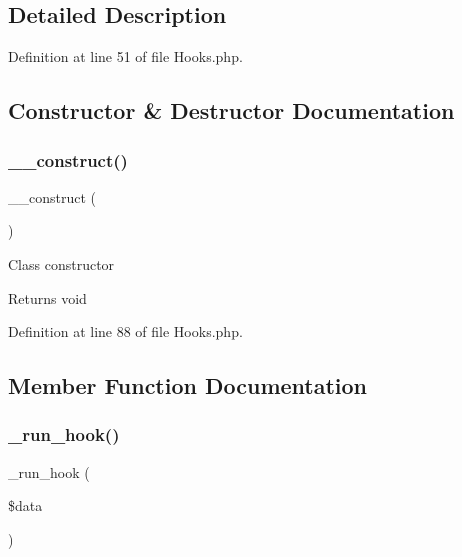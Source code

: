 \subsection{Detailed Description}


Definition at line 51 of file Hooks.\+php.



\subsection{Constructor \& Destructor Documentation}
\mbox{\label{class_c_i___hooks_a095c5d389db211932136b53f25f39685}} 
\subsubsection{\texorpdfstring{\_\_construct()}{\_\_construct()}}
{\footnotesize\ttfamily \+\_\+\+\_\+construct (\begin{DoxyParamCaption}{ }\end{DoxyParamCaption})}

Class constructor

\begin{DoxyReturn}{Returns}
void 
\end{DoxyReturn}


Definition at line 88 of file Hooks.\+php.



\subsection{Member Function Documentation}
\mbox{\label{class_c_i___hooks_a2cd07b3fcfaf153a37f164d3fbc7c3d9}} 
\subsubsection{\texorpdfstring{\_run\_hook()}{\_run\_hook()}}
{\footnotesize\ttfamily \+\_\+run\+\_\+hook (\begin{DoxyParamCaption}\item[{}]{\$data }\end{DoxyParamCaption})\hspace{0.3cm}{\ttfamily [protected]}}

